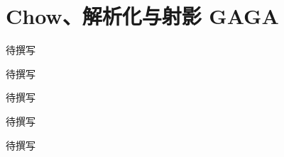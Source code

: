 
% 
% 

\chapter{Chow、解析化与射影 GAGA}
\label{g4:ch:20}

\begin{chapterabstract}
待撰写
\end{chapterabstract}

\begin{learninggoals}
待撰写
\end{learninggoals}

待撰写







\begin{chaptersummary}
待撰写
\end{chaptersummary}

\BookExercises
待撰写
